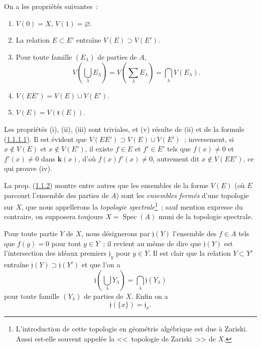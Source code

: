 \begin{proposition}[1.1.2]
\label{I.1.1.2-fr}
On a les propriétés suivantes~:
\begin{enumerate}
  \item[\rm(i)] $V(0)=X$, $V(1)=\varnothing$.
  \item[\rm(ii)] La relation $E\subset E'$ entraîne $V(E)\supset V(E')$.
  \item[\rm(iii)] Pour toute famille $(E_\lambda)$ de parties de $A$,
  \[
    V\left(\bigcup_\lambda E_\lambda\right)
      =V\left(\sum_\lambda E_\lambda\right)
      =\bigcap_\lambda V(E_\lambda).
  \]
  \item[\rm(iv)] $V(EE')=V(E)\cup V(E')$.
  \item[\rm(v)] $V(E)=V(\mathfrak{r}(E))$.
\end{enumerate}
\end{proposition}

Les propriétés (i), (ii), (iii) sont triviales, et (v) résulte de (ii) et de
la formule (\hyperref[I.1.1.1.1-fr]{1.1.1.1}). Il est évident que
$V(EE')\supset V(E)\cup V(E')$~; inversement, si $x\notin V(E)$ et
$x\notin V(E')$, il existe $f\in E$ et $f'\in E'$ tels que $f(x)\neq0$ et
$f'(x)\neq0$ dans $\boldsymbol{k}(x)$, d'où $f(x)f'(x)\neq0$, autrement dit
$x\notin V(EE')$, ce qui prouve (iv).

La prop. (\hyperref[I.1.1.2-fr]{1.1.2}) montre entre autres que les ensembles
de la forme $V(E)$ (où $E$ parcourt l'ensemble des parties de $A$) sont les
\emph{ensembles fermés} d'une topologie sur $X$, que nous appellerons la
\emph{topologie spectrale}\footnote{L'introduction de cette topologie en
géométrie algébrique est due à Zariski. Aussi est-elle souvent appelée la
<<~topologie de Zariski~>> de $X$.}~; sauf mention expresse du contraire, on
supposera toujours $X=\operatorname{Spec}(A)$ muni de la topologie spectrale.

\begin{env}[1.1.3]
\label{I.1.1.3-fr}
Pour toute partie $Y$ de $X$, nous désignerons par $\mathfrak{j}(Y)$
l'ensemble des $f\in A$ tels que $f(y)=0$ pour tout $y\in Y$~; il revient au
même de dire que $\mathfrak{j}(Y)$ est l'intersection des idéaux premiers
$\mathfrak{j}_y$ pour $y\in Y$. Il est clair que la relation $Y\subset Y'$
entraîne $\mathfrak{j}(Y)\supset\mathfrak{j}(Y')$ et que l'on a
\begin{equation}
  \mathfrak{j}\left(\bigcup_\lambda Y_\lambda\right)
    =\bigcap_\lambda\mathfrak{j}(Y_\lambda)
  \tag{1.1.3.1}\label{I.1.1.3.1-fr}
\end{equation}
pour toute famille $(Y_\lambda)$ de parties de $X$. Enfin on a
\begin{equation}
  \mathfrak{j}(\{x\})=\mathfrak{j}_x.
  \tag{1.1.3.2}\label{I.1.1.3.2-fr}
\end{equation}
\end{env}

